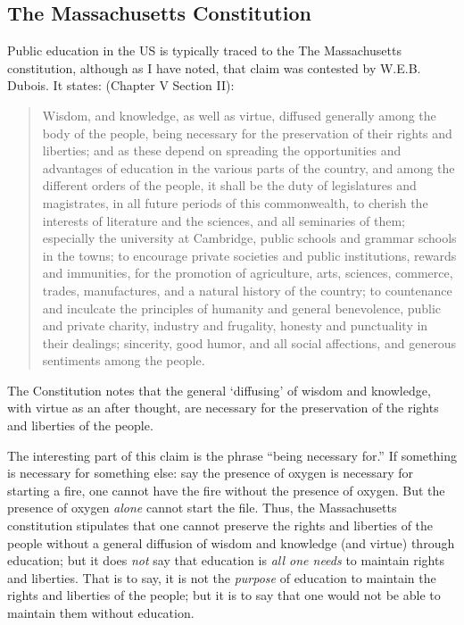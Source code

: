 \subsection{The Massachusetts Constitution}
\label{themassachusettsconstitution}

Public education in the US is typically traced to the The Massachusetts constitution, although as I have noted, that claim was contested by W.E.B. Dubois. It states: (Chapter V Section II):

\begin{quote}

Wisdom, and knowledge, as well as virtue, diffused generally among the body of the people, being necessary for the preservation of their rights and liberties; and as these depend on spreading the opportunities and advantages of education in the various parts of the country, and among the different orders of the people, it shall be the duty of legislatures and magistrates, in all future periods of this commonwealth, to cherish the interests of literature and the sciences, and all seminaries of them; especially the university at Cambridge, public schools and grammar schools in the towns; to encourage private societies and public institutions, rewards and immunities, for the promotion of agriculture, arts, sciences, commerce, trades, manufactures, and a natural history of the country; to countenance and inculcate the principles of humanity and general benevolence, public and private charity, industry and frugality, honesty and punctuality in their dealings; sincerity, good humor, and all social affections, and generous sentiments among the people.
\end{quote}

The Constitution notes that the general `diffusing' of wisdom and knowledge, with virtue as an after thought, are necessary for the preservation of the rights and liberties of the people. 

The interesting part of this claim is the phrase ``being necessary for.'' If something is necessary for something else: say the presence of oxygen is necessary for starting a fire, one cannot have the fire without the presence of oxygen. But the presence of oxygen \emph{alone} cannot start the file. Thus, the Massachusetts constitution stipulates that one cannot preserve the rights and liberties of the people without a general diffusion of wisdom and knowledge (and virtue) through education; but it does \emph{not} say that education is \emph{all one needs} to maintain rights and liberties. That is to say, it is not the \emph{purpose} of education to maintain the rights and liberties of the people; but it is to say that one would not be able to maintain them without education.

